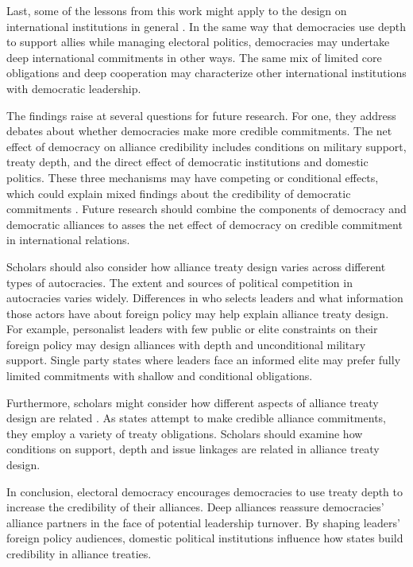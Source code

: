 \documentclass[12pt]{article}
\begin{document}
Last, some of the lessons from this work might apply to the design on international institutions in general \citep{DownesRocke1995, MartinSimmons1998, Koremenosetal2001, Thompson2010}.
In the same way that democracies use depth to support allies while managing electoral politics, democracies may undertake deep international commitments in other ways. 
The same mix of limited core obligations and deep cooperation may characterize other international institutions with democratic leadership. 


The findings raise at several questions for future research.  
For one, they address debates about whether democracies make more credible commitments. 
The net effect of democracy on alliance credibility includes conditions on military support, treaty depth, and the direct effect of democratic institutions and domestic politics. 
These three mechanisms may have competing or conditional effects, which could explain mixed findings about the credibility of democratic commitments \citep{Schultz1999, Leeds1999, Thyne2012, DownesSechser2012, PotterBaum2014}.
Future research should combine the components of democracy and democratic alliances to asses the net effect of democracy on credible commitment in international relations. 


Scholars should also consider how alliance treaty design varies across different types of autocracies. 
The extent and sources of political competition in autocracies varies widely. 
Differences in who selects leaders and what information those actors have about foreign policy \citep{Weeks2008} may help explain alliance treaty design.
For example, personalist leaders with few public or elite constraints on their foreign policy may design alliances with depth and unconditional military support. 
Single party states where leaders face an informed elite may prefer fully limited commitments with shallow and conditional obligations. 


Furthermore, scholars might consider how different aspects of alliance treaty design are related \citep{FjelstulReiter2019}. 
As states attempt to make credible alliance commitments, they employ a variety of treaty obligations. 
Scholars should examine how conditions on support, depth and issue linkages are related in alliance treaty design. 


In conclusion, electoral democracy encourages democracies to use treaty depth to increase the credibility of their alliances. 
Deep alliances reassure democracies' alliance partners in the face of potential leadership turnover. 
By shaping leaders' foreign policy audiences, domestic political institutions influence how states build credibility in alliance treaties.




 
 
\end{document}
